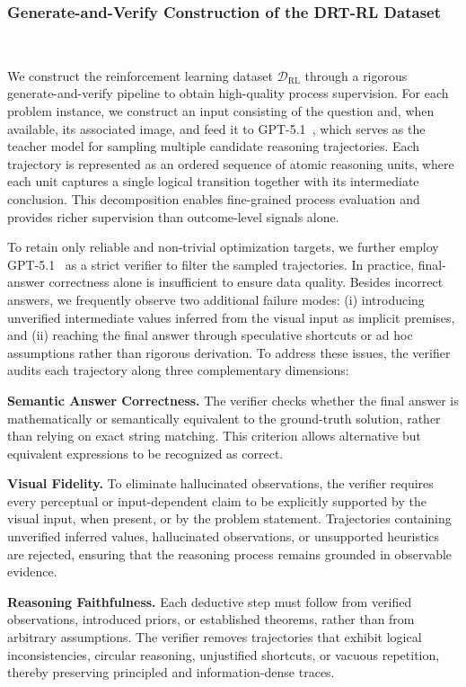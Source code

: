 \subsubsection{Generate-and-Verify Construction of the DRT-RL Dataset}~\label{RL-dataset}

We construct the reinforcement learning dataset $\mathcal{D}_{\text{RL}}$ through a rigorous generate-and-verify pipeline to obtain high-quality process supervision. For each problem instance, we construct an input consisting of the question and, when available, its associated image, and feed it to GPT-5.1~\cite{singh2025openai}, which serves as the teacher model for sampling multiple candidate reasoning trajectories. Each trajectory is represented as an ordered sequence of atomic reasoning units, where each unit captures a single logical transition together with its intermediate conclusion. This decomposition enables fine-grained process evaluation and provides richer supervision than outcome-level signals alone.

To retain only reliable and non-trivial optimization targets, we further employ GPT-5.1~\cite{singh2025openai} as a strict verifier to filter the sampled trajectories. In practice, final-answer correctness alone is insufficient to ensure data quality. Besides incorrect answers, we frequently observe two additional failure modes: (i) introducing unverified intermediate values inferred from the visual input as implicit premises, and (ii) reaching the final answer through speculative shortcuts or ad hoc assumptions rather than rigorous derivation. To address these issues, the verifier audits each trajectory along three complementary dimensions:

\noindent\textbf{Semantic Answer Correctness.}
The verifier checks whether the final answer is mathematically or semantically equivalent to the ground-truth solution, rather than relying on exact string matching. This criterion allows alternative but equivalent expressions to be recognized as correct.

\noindent\textbf{Visual Fidelity.}
To eliminate hallucinated observations, the verifier requires every perceptual or input-dependent claim to be explicitly supported by the visual input, when present, or by the problem statement. Trajectories containing unverified inferred values, hallucinated observations, or unsupported heuristics are rejected, ensuring that the reasoning process remains grounded in observable evidence.

\noindent\textbf{Reasoning Faithfulness.}
Each deductive step must follow from verified observations, introduced priors, or established theorems, rather than from arbitrary assumptions. The verifier removes trajectories that exhibit logical inconsistencies, circular reasoning, unjustified shortcuts, or vacuous repetition, thereby preserving principled and information-dense traces.

